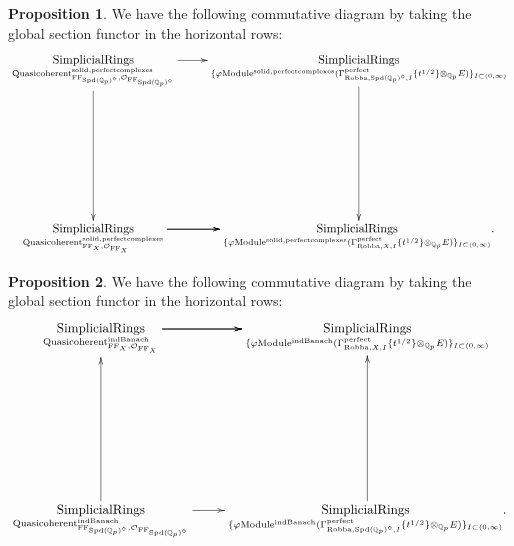 \documentclass[12pt]{book}
\theoremstyle{definition}
\newtheorem{proposition}{Proposition}
\begin{document}
\begin{proposition}
We have the following commutative diagram by taking the global section functor in the horizontal rows:
\[\displayindent=+0in
\xymatrix@C+0in@R+7pc{
\underset{\mathrm{Quasicoherent}^{\mathrm{solid,perfectcomplexes}}_{\mathrm{FF}_{\mathrm{Spd}(\mathbb{Q}_p)^\diamond},\mathcal{O}_{\mathrm{FF}_{\mathrm{Spd}(\mathbb{Q}_p)^\diamond}}}}{\mathrm{SimplicialRings}}\ar[d] \ar[r] &\underset{\{\varphi\mathrm{Module}^{\mathrm{solid,perfectcomplexes}}(\Gamma^\text{perfect}_{\text{Robba},{\mathrm{Spd}(\mathbb{Q}_p)^\diamond},I}\{t^{1/2}\}\otimes_{\mathbb{Q}_p}E)\}_{I\subset (0,\infty)}}{\mathrm{SimplicialRings}}\ar[d]\\
\underset{\mathrm{Quasicoherent}^{\mathrm{solid,perfectcomplexes}}_{\mathrm{FF}_X,\mathcal{O}_{\mathrm{FF}_X}}}{\mathrm{SimplicialRings}}  \ar[r] \ar[r] \ar[r] &\underset{\{\varphi\mathrm{Module}^{\mathrm{solid,perfectcomplexes}}(\Gamma^\text{perfect}_{\text{Robba},X,I}\{t^{1/2}\}\otimes_{\mathbb{Q}_p}E)\}_{I\subset (0,\infty)}}{\mathrm{SimplicialRings}}.  
}
\]
\end{proposition}

\begin{proposition}
We have the following commutative diagram by taking the global section functor in the horizontal rows:\\
\[\displayindent=+0in
\xymatrix@R+7pc{
\underset{\mathrm{Quasicoherent}^{\mathrm{indBanach}}_{\mathrm{FF}_X,\mathcal{O}_{\mathrm{FF}_X}}}{\mathrm{SimplicialRings}}  \ar[r] \ar[r] \ar[r] &\underset{\{\varphi\mathrm{Module}^{\mathrm{indBanach}}(\Gamma^\text{perfect}_{\text{Robba},X,I}\{t^{1/2}\}\otimes_{\mathbb{Q}_p}E)\}_{I\subset (0,\infty)}}{\mathrm{SimplicialRings}}   \\
\underset{\mathrm{Quasicoherent}^{\mathrm{indBanach}}_{\mathrm{FF}_{\mathrm{Spd}(\mathbb{Q}_p)^\diamond},\mathcal{O}_{\mathrm{FF}_{\mathrm{Spd}(\mathbb{Q}_p)^\diamond}}}}{\mathrm{SimplicialRings}} \ar[u]\ar[r] &\underset{\{\varphi\mathrm{Module}^\text{indBanach}(\Gamma^\text{perfect}_{\text{Robba},{\mathrm{Spd}(\mathbb{Q}_p)^\diamond},I}\{t^{1/2}\}\otimes_{\mathbb{Q}_p}E)\}_{I\subset (0,\infty)}}{\mathrm{SimplicialRings}}.\ar[u]  
}
\]
\end{proposition}
\end{document}

